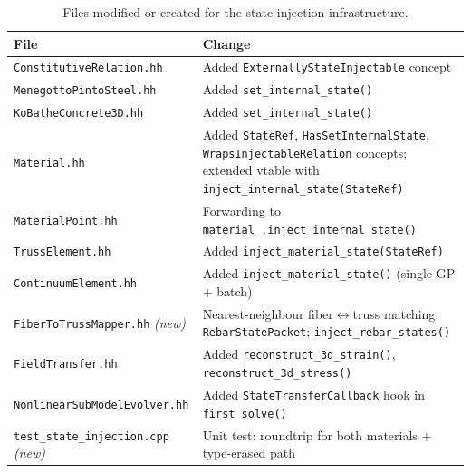 \begin{table}[htbp]
\centering
\caption{Files modified or created for the state injection infrastructure.}
\label{tab:modified-files}
\small
\begin{tabular}{@{}lp{7.5cm}@{}}
\toprule
\textbf{File} & \textbf{Change} \\
\midrule
\texttt{ConstitutiveRelation.hh}
  & Added \texttt{ExternallyStateInjectable} concept \\
\texttt{MenegottoPintoSteel.hh}
  & Added \texttt{set\_internal\_state()} \\
\texttt{KoBatheConcrete3D.hh}
  & Added \texttt{set\_internal\_state()} \\
\texttt{Material.hh}
  & Added \texttt{StateRef}, \texttt{HasSetInternalState},
    \texttt{WrapsInjectableRelation} concepts; extended vtable
    with \texttt{inject\_internal\_state(StateRef)} \\
\texttt{MaterialPoint.hh}
  & Forwarding to \texttt{material\_.inject\_internal\_state()} \\
\texttt{TrussElement.hh}
  & Added \texttt{inject\_material\_state(StateRef)} \\
\texttt{ContinuumElement.hh}
  & Added \texttt{inject\_material\_state()} (single GP + batch) \\
\texttt{FiberToTrussMapper.hh} \emph{(new)}
  & Nearest-neighbour fiber$\leftrightarrow$truss matching;
    \texttt{RebarStatePacket}; \texttt{inject\_rebar\_states()} \\
\texttt{FieldTransfer.hh}
  & Added \texttt{reconstruct\_3d\_strain()},
    \texttt{reconstruct\_3d\_stress()} \\
\texttt{NonlinearSubModelEvolver.hh}
  & Added \texttt{StateTransferCallback} hook in
    \texttt{first\_solve()} \\
\texttt{test\_state\_injection.cpp} \emph{(new)}
  & Unit test: roundtrip for both materials + type-erased path \\
\bottomrule
\end{tabular}
\end{table}
